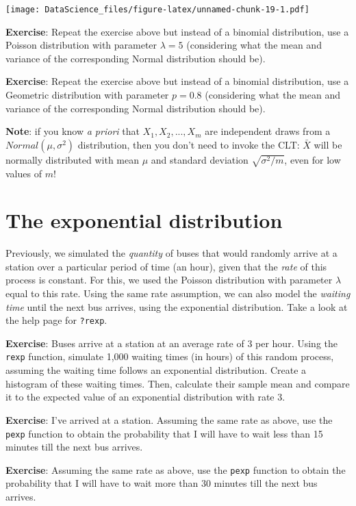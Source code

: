 \documentclass[
]{book}
\begin{document}
\texttt{[image: DataScience\_files/figure-latex/unnamed-chunk-19-1.pdf]}

\textbf{Exercise}: Repeat the exercise above but instead of a binomial
distribution, use a Poisson distribution with parameter \(\lambda=5\) (considering what the mean and variance of the corresponding Normal distribution should be).

\textbf{Exercise}: Repeat the exercise above but instead of a binomial distribution, use a Geometric distribution with parameter \(p=0.8\) (considering what the mean and variance of the corresponding Normal distribution should be).

\textbf{Note}: if you know \emph{a priori} that \(X_1, X_2, ..., X_m\) are independent draws from a \(Normal(\mu,\sigma^2)\) distribution, then you don't need to invoke the CLT: \(\bar{X}\) will be normally distributed with mean \(\mu\) and standard deviation \(\sqrt{\sigma^2 /m}\), even for low values of \(m\)!

\hypertarget{the-exponential-distribution}{%
\section{The exponential distribution}\label{the-exponential-distribution}}

Previously, we simulated the \emph{quantity} of buses that would randomly arrive at a station over a particular period of time (an hour), given that the \emph{rate} of this process is constant. For this, we used the Poisson distribution with parameter \(\lambda\) equal to this rate. Using the same rate assumption, we can also model the \emph{waiting time} until the next bus arrives, using the exponential distribution. Take a look at the help page for \texttt{?rexp}.

\textbf{Exercise}: Buses arrive at a station at an average rate of 3 per hour. Using the \texttt{rexp} function, simulate 1,000 waiting times (in hours) of this random process, assuming the waiting time follows an exponential distribution. Create a histogram of these waiting times. Then, calculate their sample mean and compare it to the expected value of an exponential distribution with rate 3.

\textbf{Exercise}: I've arrived at a station. Assuming the same rate as above, use the \texttt{pexp} function to obtain the probability that I will have to wait less than 15 minutes till the next bus arrives.

\textbf{Exercise}: Assuming the same rate as above, use the \texttt{pexp} function to obtain the probability that I will have to wait more than 30 minutes till the next bus arrives.
\end{document}
